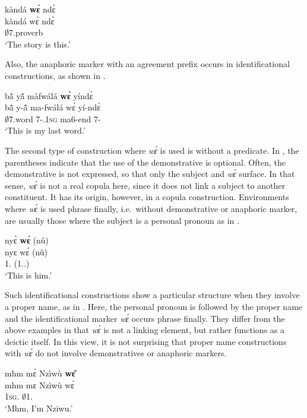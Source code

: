 \ea \label{we3}
  \glll kàndá {\bfseries wɛ́} ndɛ̀ \\
        kàndá wɛ́ ndɛ̀ \\
        $\emptyset$7.proverb {\ID} {\ANA}  \\
    \trans `The story is this.'
\z

\noindent Also, the anaphoric marker with an agreement prefix occurs in identificational constructions, as shown in .

\ea \label{we4}
  \glll bã̂ yã̂ màfwálá {\bfseries wɛ́} yíndɛ̀ \\
        bã̂ y-ã̂ ma-fwálá wɛ́ yí-ndɛ̀ \\
         $\emptyset$7.word 7-{\POSS}.1\textsc{sg} ma6-end {\ID} 7-{\ANA} \\
    \trans `This is my last word.'
\z


The second type of construction where {\itshape wɛ́} is used is without a predicate. In , the parentheses indicate that the use of the demonstrative is optional. Often, the demonstrative is not expressed, so that only the subject and {\itshape wɛ́} surface. In that sense, {\itshape wɛ́} is not a real copula here, since it does not link a subject to another constituent. It has its origin, however, in a copula construction. Environments where {\itshape wɛ́} is used phrase finally, i.e.\ without demonstrative or anaphoric marker, are usually those where the subject is a personal pronoun as in .


\ea \label{we5}
  \glll  nyɛ̀ {\bfseries wɛ́} (nû) \\
         nyɛ wɛ́ (nû)\\
       1.{\SBJ} {\ID}  (1.{\DEM}.{\PROX})\\
    \trans `This is him.'
\z

Such identificational constructions show a particular structure when they involve a proper name, as in . Here, the personal pronoun is followed by the proper name and the identificational marker {\itshape wɛ́} occurs phrase finally. They differ from the above examples in that {\itshape wɛ́} is not a linking element, but rather functions as a deictic itself. In this view, it is not surprising that proper name constructions with {\itshape wɛ́} do not involve demonstratives or anaphoric markers.

\ea \label{we6}
  \glll  mhm mɛ̀ Nzìwù {\bfseries wɛ̂} \\
         mhm mɛ Nzìwù wɛ́ \\
       {\EXCL} 1\textsc{sg}.{\SBJ} $\emptyset$1.{\PN}  {\ID}  \\
    \trans `Mhm, I'm Nziwu.'
\z


